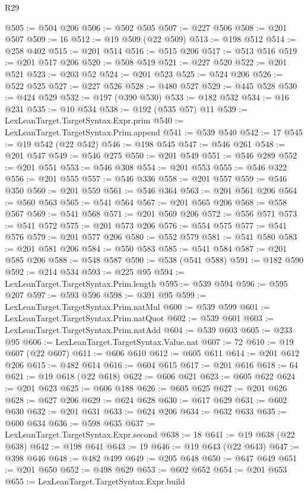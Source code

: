 \begin{lexlean}{R29}
\begin{coremodule}
@505 := @504 @206
@506 := @502 @505
@507 := @227 @506
@508 := @201 @507
@509 := 16
@512 := @19 @509 (@22 @509)
@513 := @198 @512
@514 := @258 @402
@515 := @201 @514
@516 := @515 @206
@517 := @513 @516
@519 := @201 @517 @206
@520 := @508 @519
@521 := @227 @520
@522 := @201 @521
@523 := @203 @52
@524 := @201 @523
@525 := @524 @206
@526 := @522 @525
@527 := @227 @526
@528 := @480 @527
@529 := @445 @528
@530 := @424 @529
@532 := @197 (@390 @530)
@533 := @182 @532
@534 := @16 @231
@535 := @10 @534
@538 := @192 (@535 @57) @11
@539 := LexLeanTarget.TargetSyntax.Expr.prim
@540 := LexLeanTarget.TargetSyntax.Prim.append
@541 := @539 @540
@542 := 17
@545 := @19 @542 (@22 @542)
@546 := @198 @545
@547 := @546 @261
@548 := @201 @547
@549 := @546 @275
@550 := @201 @549
@551 := @546 @289
@552 := @201 @551
@553 := @546 @308
@554 := @201 @553
@555 := @546 @322
@556 := @201 @555
@557 := @546 @336
@558 := @201 @557
@559 := @546 @350
@560 := @201 @559
@561 := @546 @364
@563 := @201 @561 @206
@564 := @560 @563
@565 := @541 @564
@567 := @201 @565 @206
@568 := @558 @567
@569 := @541 @568
@571 := @201 @569 @206
@572 := @556 @571
@573 := @541 @572
@575 := @201 @573 @206
@576 := @554 @575
@577 := @541 @576
@579 := @201 @577 @206
@580 := @552 @579
@581 := @541 @580
@583 := @201 @581 @206
@584 := @550 @583
@585 := @541 @584
@587 := @201 @585 @206
@588 := @548 @587
@590 := @538 (@541 @588)
@591 := @182 @590
@592 := @214 @534
@593 := @225 @95
@594 := LexLeanTarget.TargetSyntax.Prim.length
@595 := @539 @594
@596 := @595 @207
@597 := @593 @596
@598 := @391 @95
@599 := LexLeanTarget.TargetSyntax.Prim.natMul
@600 := @539 @599
@601 := LexLeanTarget.TargetSyntax.Prim.natQuot
@602 := @539 @601
@603 := LexLeanTarget.TargetSyntax.Prim.natAdd
@604 := @539 @603
@605 := @233 @95
@606 := LexLeanTarget.TargetSyntax.Value.nat
@607 := 72
@610 := @19 @607 (@22 @607)
@611 := @606 @610
@612 := @605 @611
@614 := @201 @612 @206
@615 := @482 @614
@616 := @604 @615
@617 := @201 @616
@618 := 64
@621 := @19 @618 (@22 @618)
@622 := @606 @621
@623 := @605 @622
@624 := @201 @623
@625 := @606 @188
@626 := @605 @625
@627 := @201 @626
@628 := @627 @206
@629 := @624 @628
@630 := @617 @629
@631 := @602 @630
@632 := @201 @631
@633 := @624 @206
@634 := @632 @633
@635 := @600 @634
@636 := @598 @635
@637 := LexLeanTarget.TargetSyntax.Expr.second
@638 := 18
@641 := @19 @638 (@22 @638)
@642 := @198 @641
@643 := 19
@646 := @19 @643 (@22 @643)
@647 := @398 @646
@648 := @482 @499
@649 := @205 @648
@650 := @647 @649
@651 := @201 @650
@652 := @498 @629
@653 := @602 @652
@654 := @201 @653
@655 := LexLeanTarget.TargetSyntax.Expr.build

\end{coremodule}
\end{lexlean}
